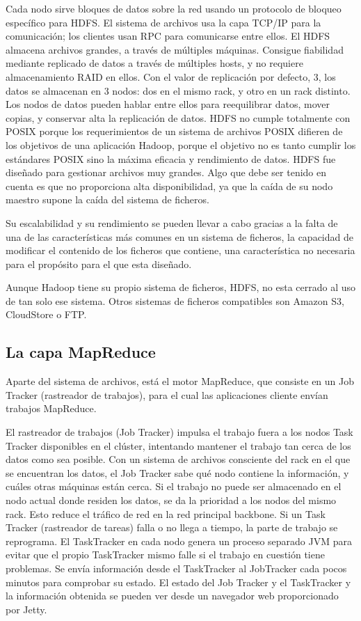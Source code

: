 Cada nodo sirve bloques de datos sobre la red usando un protocolo de bloqueo específico para HDFS. El sistema de archivos usa la capa TCP/IP para la comunicación; los clientes usan RPC para comunicarse entre ellos. El HDFS almacena archivos grandes, a través de múltiples máquinas. Consigue fiabilidad mediante replicado de datos a través de múltiples hosts, y no requiere almacenamiento RAID en ellos. Con el valor de replicación por defecto, 3, los datos se almacenan en 3 nodos: dos en el mismo rack, y otro en un rack distinto. Los nodos de datos pueden hablar entre ellos para reequilibrar datos, mover copias, y conservar alta la replicación de datos. HDFS no cumple totalmente con POSIX porque los requerimientos de un sistema de archivos POSIX difieren de los objetivos de una aplicación Hadoop, porque el objetivo no es tanto cumplir los estándares POSIX sino la máxima eficacia y rendimiento de datos. HDFS fue diseñado para gestionar archivos muy grandes. Algo que debe ser tenido en cuenta es que no proporciona alta disponibilidad, ya que la caída de su nodo maestro supone la caída del sistema de ficheros.

Su escalabilidad y su rendimiento se pueden llevar a cabo gracias a la falta de una de las características m\'as comunes en un sistema de ficheros, la capacidad de modificar el contenido de los ficheros que contiene, una característica no necesaria para el propósito para el que esta dise\~nado.

Aunque Hadoop tiene su propio sistema de ficheros, HDFS, no esta cerrado al uso de tan solo ese sistema. Otros sistemas de ficheros compatibles son Amazon S3, CloudStore o FTP.

\subsection{La capa MapReduce}

Aparte del sistema de archivos, está el motor MapReduce, que consiste en un Job Tracker (rastreador de trabajos), para el cual las aplicaciones cliente envían trabajos MapReduce.

El rastreador de trabajos (Job Tracker) impulsa el trabajo fuera a los nodos Task Tracker disponibles en el clúster, intentando mantener el trabajo tan cerca de los datos como sea posible. Con un sistema de archivos consciente del rack en el que se encuentran los datos, el Job Tracker sabe qué nodo contiene la información, y cuáles otras máquinas están cerca. Si el trabajo no puede ser almacenado en el nodo actual donde residen los datos, se da la prioridad a los nodos del mismo rack. Esto reduce el tráfico de red en la red principal backbone. Si un Task Tracker (rastreador de tareas) falla o no llega a tiempo, la parte de trabajo se reprograma. El TaskTracker en cada nodo genera un proceso separado JVM para evitar que el propio TaskTracker mismo falle si el trabajo en cuestión tiene problemas. Se envía información desde el TaskTracker al JobTracker cada pocos minutos para comprobar su estado. El estado del Job Tracker y el TaskTracker y la información obtenida se pueden ver desde un navegador web proporcionado por Jetty.

